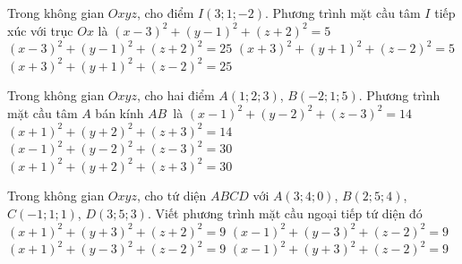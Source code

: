 \begin{ex}%
	Trong không gian $Oxyz$, cho điểm $I\left(3;1;-2\right)$.  Phương trình mặt cầu tâm $I$ tiếp xúc với trục $Ox$ là
	 \choice
		{\True $\left(x-3\right)^2+\left(y-1\right)^2+\left(z+2\right)^2=5$} 
		 {$\left(x-3\right)^2+\left(y-1\right)^2+\left(z+2\right)^2=25$}
		 {$\left(x+3\right)^2+\left(y+1\right)^2+\left(z-2\right)^2=5$}
		 {$\left(x+3\right)^2+\left(y+1\right)^2+\left(z-2\right)^2=25$}
\end{ex}

\begin{ex}%
	Trong không gian $Oxyz$, cho hai điểm $A(1;2;3)$,  $B(-2;1;5)$. Phương trình mặt cầu tâm $A$ bán kính $AB$~là
	\choice 
		{\True $(x-1)^2+(y-2)^2+(z-3)^2=14$} 
		 {$(x+1)^2+(y+2)^2+(z+3)^2=14$}
		{$(x-1)^2+(y-2)^2+(z-3)^2=30$} 
		{$(x+1)^2+(y+2)^2+(z+3)^2=30$} 
\end{ex}

\begin{ex}%
	Trong không gian $Oxyz$, cho tứ diện $ABCD$ với $A\left(3;4;0\right)$, $B\left(2;5;4\right)$, $C\left(-1;1;1\right)$, $D\left(3;5;3\right)$. Viết phương trình mặt cầu ngoại tiếp tứ diện đó 
	\choice 
		 {$\left(x+1\right)^2+\left(y+3\right)^2+\left(z+2\right)^2=9$}
		{\True  $\left(x-1\right)^2+\left(y-3\right)^2+\left(z-2\right)^2=9$}
		 {$\left(x+1\right)^2+\left(y-3\right)^2+\left(z-2\right)^2=9$}
		 {$\left(x-1\right)^2+\left(y+3\right)^2+\left(z-2\right)^2=9$}
\end{ex}

